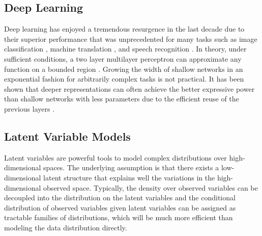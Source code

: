 \documentclass[journal, peerreview]{IEEEtran}
\begin{document}
\subsection{Deep Learning}
\label{sec:bckgrnd:deep-learning}
Deep learning has enjoyed a tremendous resurgence in the last decade due to their superior performance that was unprecedented for many tasks such as image classification \cite{krizhevsky2012imagenet}, machine translation \cite{bahdanau2014neural}, 
and speech recognition \cite{amodei2016deep}. In theory, under sufficient conditions, a two layer multilayer perceptron can approximate any function on a bounded region \cite{cybenko1989approximation,Hornik1991-li}. Growing the width of shallow networks in an exponential fashion for arbitrarily complex tasks is not practical. It has been shown that deeper representations can often achieve the better expressive power than shallow networks with less parameters due to the efficient reuse of the previous layers  \cite{eldan2016power}.


\subsection{Latent Variable Models}
\label{sec:bckgrnd:lvms}
Latent variables are powerful tools to model complex distributions over high-dimensional spaces.
The underlying assumption is that there exists a low-dimensional latent structure that explains well the variations in the high-dimensional observed space. Typically,  the density over observed variables can be decoupled into the distribution on the latent variables and the conditional distribution of observed variables given latent variables can be assigned as tractable families of distributions, which will be much more efficient than modeling the data distribution directly. 
\end{document}
